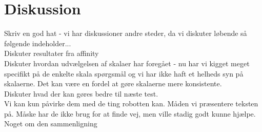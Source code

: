 \chapter{Diskussion}
\label{ParametreDiskussion}
%
Skriv en god hat - vi har diskussioner andre steder, da vi diskuter løbende så følgende indeholder...\\
Diskuter resultater fra affinity\\
Diskuter hvordan udvælgelsen af skalaer har foregået - nu har vi kigget meget specifikt på de enkelte skala spørgsmål og vi har ikke haft et helheds syn på skalaerne. Det kan være en fordel at gøre skalaerne mere konsistente. \\
Diskuter hvad der kan gøres bedre til næste test. \\
Vi kan kun påvirke dem med de ting robotten kan. Måden vi præsentere teksten på. Måske har de ikke brug for at finde vej, men ville stadig godt kunne hjælpe. 
Noget om den sammenligning